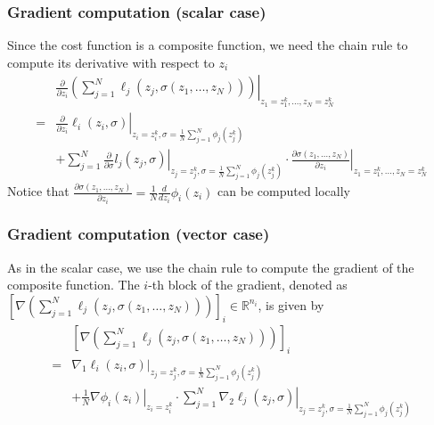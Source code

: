 \documentclass{book}
\newcommand{\R}{\mathbb{R}}
\theoremstyle{theoremv2}
\theoremstyle{defv2}
\theoremstyle{remark}
\theoremstyle{remark}
\theoremstyle{definition}
\theoremstyle{definition}
\begin{document}
\subsubsection{Gradient computation (scalar case)}
Since the cost function is a composite function, we need the chain rule to compute its derivative with respect to $z_i$ 
\begin{align*}
    &\displaystyle\frac{\partial}{\partial z_i}\left.\left(\displaystyle\sum_{j=1}^{N}\ell_j(z_j,\sigma(z_1,\dots,z_N))\right)\right|_{z_1 = z_1^k,\dots,z_N = z_N^k} \\
    =& \left.\displaystyle\frac{\partial}{\partial z_i} \ell_i(z_i,\sigma)\right|_{z_i=z_i^k, \sigma=\frac{1}{N}\sum_{j=1}^{N}\phi_j(z_j^k)}  \\
    &+\left. \sum_{j=1}^{N}\displaystyle\frac{\partial}{\partial\sigma}l_j(z_j,\sigma)\right|_{z_j=z_j^k, \sigma=\frac{1}{N}\sum_{j=1}^{N}\phi_j(z_j^k)}\cdot \left.\displaystyle\frac{\partial\sigma(z_1,\dots,z_N)}{\partial z_i}\right|_{z_1=z_1^k,\dots,z_N = z_N^k}
\end{align*}
Notice that $\displaystyle\frac{\partial\sigma(z_1,\dots,z_N)}{\partial z_i}=\displaystyle\frac{1}{N}\displaystyle\frac{d}{d z_i}\phi_i(z_i)$ can be computed locally

\subsubsection{Gradient computation (vector case)}
As in the scalar case, we use the chain rule to compute the gradient of the composite function. The $i$-th block of the gradient, denoted as $\left[\nabla\left(\displaystyle\sum_{j=1}^{N}\ell_j(z_j,\sigma(z_1,\dots,z_N))\right)\right]_i\in\R^{n_i}$, is given by
\begin{align*}
    &\left[\nabla\left(\displaystyle\sum_{j=1}^{N}\ell_j(z_j,\sigma(z_1,\dots,z_N))\right)\right]_i \\ 
    =& \left.\nabla_1\ell_i(z_i,\sigma)\right|_{z_j=z_j^k, \sigma=\frac{1}{N}\sum_{j=1}^{N}\phi_j(z_j^k)} \\ 
    &+ \left.\displaystyle\frac{1}{N}\nabla \phi_i(z_i)\right|_{z_i=z_i^k}\cdot \left.\displaystyle\sum_{j=1}^{N}\nabla_2 \ell_j(z_j,\sigma)\right|_{z_j=z_j^k, \sigma=\frac{1}{N}\sum_{j=1}^{N}\phi_j(z_j^k)}
\end{align*}
\end{document}
